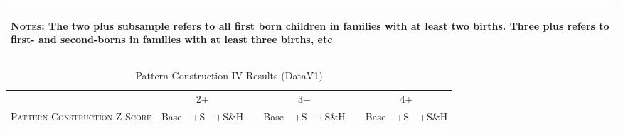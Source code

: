 \begin{landscape}
\begin{table}[htpb!]
\begin{center}
\begin{tabular}{lcccp{2mm}cccp{2mm}ccc}
\midrule\multicolumn{12}{p{19.2cm}}{\begin{footnotesize}\textsc{Notes:} The two plus subsample refers to all first born children in families with at least two births.  Three plus refers to first- and second-borns in families with at least three births, etc\end{footnotesize}} \\ \bottomrule 
\end{tabular}\end{center}\end{table}\end{landscape}\begin{landscape}\begin{table}[htpb!]\caption{Pattern Construction IV Results (DataV1)}
\label{TWINtab:IVAll}
\begin{center}\begin{tabular}{lcccp{2mm}cccp{2mm}ccc}
\toprule \toprule 
&\multicolumn{3}{c}{2+}&&\multicolumn{3}{c}{3+}&&\multicolumn{3}{c}{4+}\\ \cmidrule(r){2-4} \cmidrule(r){6-8} \cmidrule(r){10-12} 
\textsc{Pattern Construction Z-Score}&Base&+S&+S\&H&&Base&+S&+S\&H&&Base&+S&+S\&H\\ \midrule 
\begin{footnotesize}\end{footnotesize}& 
\begin{footnotesize}\end{footnotesize}& 
\begin{footnotesize}\end{footnotesize}& 
\begin{footnotesize}\end{footnotesize}& 
\begin{footnotesize}\end{footnotesize}& 
\begin{footnotesize}\end{footnotesize}& 
\begin{footnotesize}\end{footnotesize}& 
\begin{footnotesize}\end{footnotesize}& 
\begin{footnotesize}\end{footnotesize}& 
\begin{footnotesize}\end{footnotesize}& 
\begin{footnotesize}\end{footnotesize}& 

\end{tabular}
\end{center}
\end{table}
\end{landscape}
